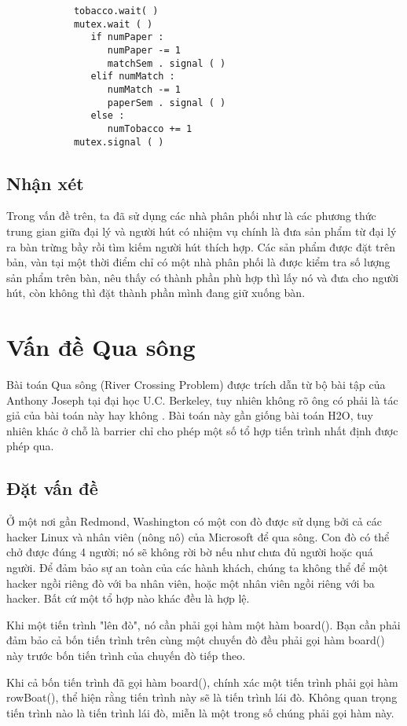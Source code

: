 \documentclass[a4paper]{article}
\begin{document}
	\begin{tcolorbox}
		\begin{verbatim}
		 	tobacco.wait( )
			mutex.wait ( )
			   if numPaper :
			      numPaper -= 1
			      matchSem . signal ( )
			   elif numMatch :
			      numMatch -= 1
			      paperSem . signal ( )
			   else :
			      numTobacco += 1
			mutex.signal ( )
		\end{verbatim}
	\end{tcolorbox}	
	
	\subsection{Nhận xét}
	Trong vấn đề trên, ta đã sử dụng các nhà phân phối như là các phương thức trung gian giữa đại lý và người hút 
	có nhiệm vụ chính là đưa sản phẩm từ đại lý ra bàn trừng bầy rồi tìm kiếm người hút thích hợp. Các sản phẩm được đặt trên bản, vàn tại một thời điểm chỉ 
	có một nhà phân phối là được kiểm tra số lượng sản phẩm trên bàn, nêu thấy có thành phần phù hợp thì lấy nó và
	đưa cho người hút, còn không thì đặt thành phần mình đang giữ xuống bàn. 
	
	\pagebreak
	\section{Vấn đề Qua sông}
	Bài toán Qua sông (River Crossing Problem) được trích dẫn từ bộ bài tập của Anthony Joseph tại đại học U.C. Berkeley, 
	tuy nhiên không rõ ông có phải là tác giả của bài toán này hay không \cite{littlebook5}. Bài toán này gần giống bài toán
	H2O, tuy nhiên khác ở chỗ là barrier chỉ cho phép một số tổ hợp tiến trình nhất định được phép qua.
	
	\subsection{Đặt vấn đề}
	
	\begin{tcolorbox}
		Ở một nơi gần Redmond, Washington có một con đò được sử dụng bởi cả
		các hacker Linux và nhân viên (nông nô) của Microsoft để qua 
		sông. Con đò có thể chở được đúng 4 người; nó sẽ không rời bờ nếu như
		chưa đủ người hoặc quá người. Để đảm bảo sự an toàn của các hành khách,
		chúng ta không thể để một hacker ngồi riêng đò với ba nhân viên, hoặc một
		nhân viên ngồi riêng với ba hacker. Bất cứ một tổ hợp nào khác đều là hợp lệ.

		Khi một tiến trình "lên đò", nó cần phải gọi hàm một hàm board(). Bạn cần phải 
		đảm bảo cả bốn tiến trình trên cùng một chuyến đò đều phải gọi hàm board() này 
		trước bốn tiến trình của chuyến đò tiếp theo.

		Khi cả bốn tiến trình đã gọi hàm board(), chính xác một tiến trình phải gọi hàm 
		rowBoat(), thể hiện rằng tiến trình này sẽ là tiến trình lái đò. Không quan trọng 
		tiến trình nào là tiến trình lái đò, miễn là một trong số chúng phải gọi hàm này.
	\end{tcolorbox}
	
\end{document}
